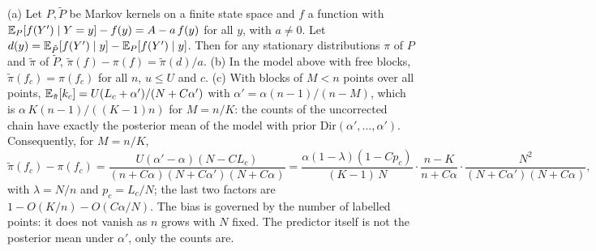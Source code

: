 \begin{proposition}\label{prop:predbias}
(a) Let $P,\tilde P$ be Markov kernels on a finite state space and $f$ a function with
$\mathbb{E}_P[f(Y')\mid Y=y]-f(y)=A-a\,f(y)$ for all $y$, with $a\neq0$. Let
$d(y)=\mathbb{E}_{\tilde P}[f(Y')\mid y]-\mathbb{E}_P[f(Y')\mid y]$. Then for any stationary distributions $\pi$ of $P$ and $\tilde\pi$ of
$\tilde P$, $\tilde\pi(f)-\pi(f)=\tilde\pi(d)/a$.
(b) In the model above with free blocks, $\tilde\pi(f_c)=\pi(f_c)$ for all $n$, $u\le U$ and $c$.
(c) With blocks of $M<n$ points over all points, $\mathbb{E}_{\tilde\pi}[k_c]=U(L_c+\alpha')/(N+C\alpha')$ with
$\alpha'=\alpha(n-1)/(n-M)$, which is $\alpha\,K(n-1)/((K-1)n)$ for $M=n/K$: the counts of the uncorrected chain have
exactly the posterior mean of the model with prior $\mathrm{Dir}(\alpha',\dots,\alpha')$. Consequently, for $M=n/K$,
\[
  \tilde\pi(f_c)-\pi(f_c)=\frac{U(\alpha'-\alpha)(N-CL_c)}{(n+C\alpha)(N+C\alpha')(N+C\alpha)}
  =\frac{\alpha(1-\lambda)(1-Cp_c)}{(K-1)\,N}\cdot\frac{n-K}{n+C\alpha}\cdot\frac{N^2}{(N+C\alpha')(N+C\alpha)},
\]
with $\lambda=N/n$ and $p_c=L_c/N$; the last two factors are $1-O(K/n)-O(C\alpha/N)$. The bias is governed by the number of labelled points: it does not vanish as $n$
grows with $N$ fixed. The predictor itself is not the posterior mean under $\alpha'$, only the counts are.
\end{proposition}
